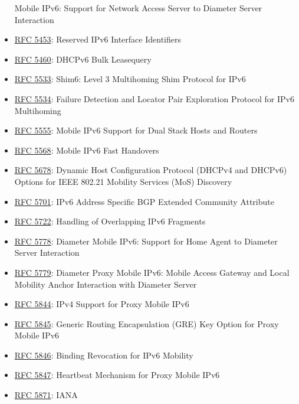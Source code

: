 \documentclass[
]{article}
\begin{document}
\begin{itemize}
  Mobile IPv6: Support for Network Access Server to Diameter Server
  Interaction
\item
  \href{https://www.rfc-editor.org/info/rfc5453}{RFC 5453}: Reserved
  IPv6 Interface Identifiers
\item
  \href{https://www.rfc-editor.org/info/rfc5460}{RFC 5460}: DHCPv6 Bulk
  Leasequery
\item
  \href{https://www.rfc-editor.org/info/rfc5533}{RFC 5533}: Shim6: Level
  3 Multihoming Shim Protocol for IPv6
\item
  \href{https://www.rfc-editor.org/info/rfc5534}{RFC 5534}: Failure
  Detection and Locator Pair Exploration Protocol for IPv6 Multihoming
\item
  \href{https://www.rfc-editor.org/info/rfc5555}{RFC 5555}: Mobile IPv6
  Support for Dual Stack Hosts and Routers
\item
  \href{https://www.rfc-editor.org/info/rfc5568}{RFC 5568}: Mobile IPv6
  Fast Handovers
\item
  \href{https://www.rfc-editor.org/info/rfc5678}{RFC 5678}: Dynamic Host
  Configuration Protocol (DHCPv4 and DHCPv6) Options for IEEE 802.21
  Mobility Services (MoS) Discovery
\item
  \href{https://www.rfc-editor.org/info/rfc5701}{RFC 5701}: IPv6 Address
  Specific BGP Extended Community Attribute
\item
  \href{https://www.rfc-editor.org/info/rfc5722}{RFC 5722}: Handling of
  Overlapping IPv6 Fragments
\item
  \href{https://www.rfc-editor.org/info/rfc5778}{RFC 5778}: Diameter
  Mobile IPv6: Support for Home Agent to Diameter Server Interaction
\item
  \href{https://www.rfc-editor.org/info/rfc5779}{RFC 5779}: Diameter
  Proxy Mobile IPv6: Mobile Access Gateway and Local Mobility Anchor
  Interaction with Diameter Server
\item
  \href{https://www.rfc-editor.org/info/rfc5844}{RFC 5844}: IPv4 Support
  for Proxy Mobile IPv6
\item
  \href{https://www.rfc-editor.org/info/rfc5845}{RFC 5845}: Generic
  Routing Encapsulation (GRE) Key Option for Proxy Mobile IPv6
\item
  \href{https://www.rfc-editor.org/info/rfc5846}{RFC 5846}: Binding
  Revocation for IPv6 Mobility
\item
  \href{https://www.rfc-editor.org/info/rfc5847}{RFC 5847}: Heartbeat
  Mechanism for Proxy Mobile IPv6
\item
  \href{https://www.rfc-editor.org/info/rfc5871}{RFC 5871}: IANA

\end{itemize}
\end{document}
